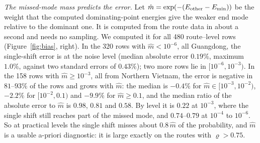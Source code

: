 \documentclass[ijoc,sglanonrev]{informs4}
\begin{document}
\emph{The missed-mode mass predicts the error.} Let
$\hat m=\exp(-(E_{\rm other}-E_{\min}))$ be the weight that the computed
dominating-point energies give the weaker end mode relative to the dominant
one. It is computed from the route data in about a second and needs no
sampling. We computed it for all 480 route--level rows
(Figure~\ref{fig:bias}, right). In the 320 rows with $\hat m<10^{-6}$, all
Guangdong, the single-shift error is at the noise level (median absolute error
$0.19\%$, maximum $1.0\%$, against two standard errors of $0.43\%$); two more
rows lie in $[10^{-6},10^{-3})$.
In the 158 rows with $\hat m\ge10^{-3}$, all from Northern Vietnam, the error
is negative in $81$--$93\%$ of the rows and grows with $\hat m$: the median is
$-0.4\%$ for $\hat m\in[10^{-3},10^{-2})$, $-2.2\%$ for $[10^{-2},0.1)$ and
$-9.9\%$ for $\hat m\ge0.1$, and the median ratio of the absolute error to
$\hat m$ is $0.98$, $0.81$ and $0.58$. By level it is $0.22$ at $10^{-3}$, where
the single shift still reaches part of the missed mode, and $0.74$--$0.79$ at
$10^{-4}$ to $10^{-6}$. So at practical levels the single shift misses
about $0.8\,\hat m$ of the probability, and $\hat m$ is a usable
a-priori diagnostic: it is large exactly on the routes with $\varrho>0.75$.
\end{document}
